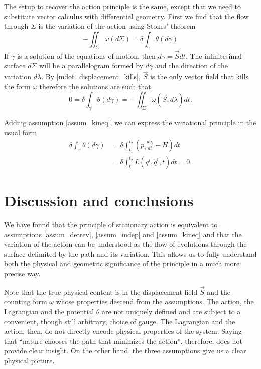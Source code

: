\documentclass[10pt,twocolumn, nofootinbib]{revtex4-2}
\begin{document}
The setup to recover the action principle is the same, except that we need to substitute vector calculus with differential geometry. First we find that the flow through $\Sigma$ is the variation of the action using Stokes' theorem
\begin{equation}\label{mdof_action}
	- \iint_{\Sigma} \omega(d\Sigma) = \delta \int_{\gamma} \theta(d\gamma) 
\end{equation}
If $\gamma$ is a solution of the equations of motion, then $d\gamma = \vec{S} dt$. The infinitesimal surface $d\Sigma$ will be a parallelogram formed by $d\gamma$ and the direction of the variation $d\lambda$. By \ref{mdof_displacement_kills}, $\vec{S}$ is the only vector field that kills the form $\omega$ therefore the solutions are such that
\begin{equation}\label{mdof_stationary_action}
		0 = \delta \int_{\gamma} \theta(d\gamma) = - \iint_{\Sigma} \omega(\vec{S}, d\lambda) dt. 
\end{equation}

Adding assumption \ref{assum_kineq}, we can express the variational principle in the usual form
\begin{equation}\label{mdof_Lagrangian}
	\begin{aligned}
		\delta \int_{\gamma} \theta(d\gamma) &= \delta \int^{t_2}_{t_1}\left( p_i \frac{dq_i}{dt} - H \right) dt \\
		 &= \delta \int^{t_2}_{t_1}L(q^i, \dot{q}^i, t) dt = 0.
	\end{aligned}
\end{equation}

\section{Discussion and conclusions}

We have found that the principle of stationary action is equivalent to assumptions \ref{assum_detrev}, \ref{assum_indep} and \ref{assum_kineq} and that the variation of the action can be understood as the flow of evolutions through the surface delimited by the path and its variation. This allows us to fully understand both the physical and geometric significance of the principle in a much more precise way.

Note that the true physical content is in the displacement field $\vec{S}$ and the counting form $\omega$ whose properties descend from the assumptions. The action, the Lagrangian and the potential $\theta$ are not uniquely defined and are subject to a convenient, though still arbitrary, choice of gauge. The Lagrangian and the action, then, do not directly encode physical properties of the system. Saying that ``nature chooses the path that minimizes the action'', therefore, does not provide clear insight. On the other hand, the three assumptions give us a clear physical picture.
\end{document}

